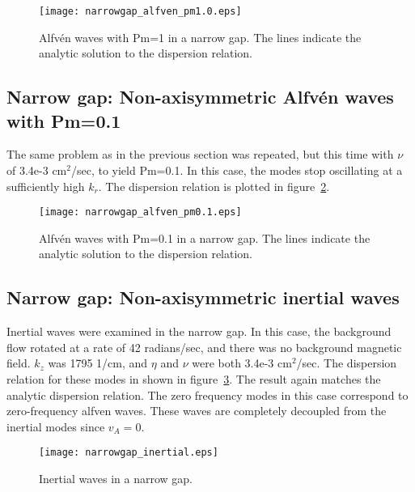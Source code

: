 \documentclass[letterpaper]{article}
\begin{document}
\begin{figure}
\begin{center}
\texttt{[image: narrowgap\_alfven\_pm1.0.eps]}
\caption{Alfv\'en waves with Pm=1 in a narrow gap.  The lines indicate the analytic solution to the dispersion relation.}
\label{fig:narrowgapalfven}
\end{center}
\end{figure}

\subsection{Narrow gap: Non-axisymmetric Alfv\'en waves with Pm=0.1}

The same problem as in the previous section was repeated, but this time with $\nu$ of 3.4e-3 cm$^2$/sec, to yield Pm=0.1.  In this case, the modes stop oscillating at a sufficiently high $k_r$.  The dispersion relation is plotted in figure~\ref{fig:narrowgapalfvenpm0.1}.

\begin{figure}
\begin{center}
\texttt{[image: narrowgap\_alfven\_pm0.1.eps]}
\caption{Alfv\'en waves with Pm=0.1 in a narrow gap.  The lines indicate the analytic solution to the dispersion relation.}
\label{fig:narrowgapalfvenpm0.1}
\end{center}
\end{figure}

\subsection{Narrow gap: Non-axisymmetric inertial waves}
Inertial waves were examined in the narrow gap.  In this case, the background flow rotated at a rate of 42 radians/sec, and there was no background magnetic field.  $k_z$ was 1795 1/cm, and $\eta$ and $\nu$ were both 3.4e-3 cm$^2$/sec.  The dispersion relation for these modes in shown in figure~\ref{fig:narrowgapinertial}.  The result again matches the analytic dispersion relation.  The zero frequency modes in this case correspond to zero-frequency alfven waves.  These waves are completely decoupled from the inertial modes since $v_{A}=0$.

\begin{figure}
\begin{center}
\texttt{[image: narrowgap\_inertial.eps]}
\caption{Inertial waves in a narrow gap.}
\label{fig:narrowgapinertial}
\end{center}
\end{figure}
\end{document}
